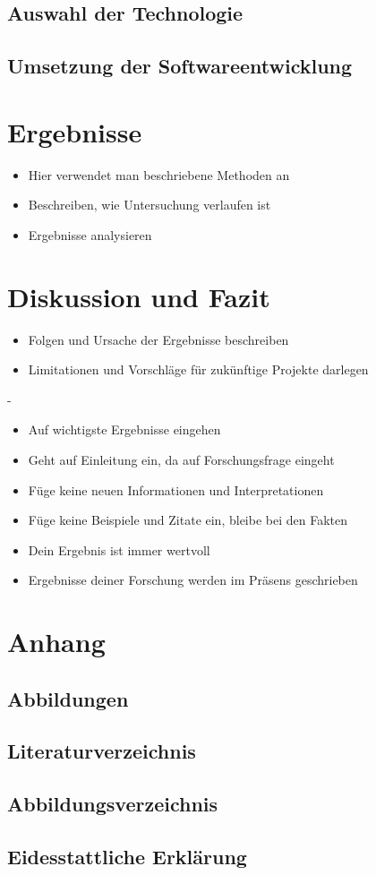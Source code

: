 \documentclass[a4paper,12pt,oneside]{article}
\begin{document}
    \subsection{Auswahl der Technologie}
    
    \subsection{Umsetzung der Softwareentwicklung}
  \section{Ergebnisse}
    \begin{itemize}
      \item Hier verwendet man beschriebene Methoden an
      \item Beschreiben, wie Untersuchung verlaufen ist
      \item Ergebnisse analysieren
    \end{itemize}
  \section{Diskussion und Fazit}
    \begin{itemize}
      \item Folgen und Ursache der Ergebnisse beschreiben
      \item Limitationen und Vorschläge für zukünftige Projekte darlegen
    \end{itemize}
    -
    \begin{itemize}
      \item Auf wichtigste Ergebnisse eingehen
      \item Geht auf Einleitung ein, da auf Forschungsfrage eingeht
      \item Füge keine neuen Informationen und Interpretationen
      \item Füge keine Beispiele und Zitate ein, bleibe bei den Fakten
      \item Dein Ergebnis ist immer wertvoll
      \item Ergebnisse deiner Forschung werden im Präsens geschrieben
    \end{itemize}
  \section{Anhang}
    \subsection{Abbildungen}
    \subsection{Literaturverzeichnis}
      \printbibliography
    \subsection{Abbildungsverzeichnis}
    \subsection{Eidesstattliche Erklärung} 
\end{document}
